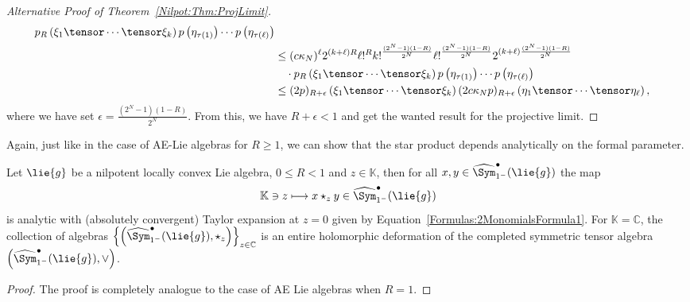 \begin{proof}[Alternative Proof of Theorem~\ref{Nilpot:Thm:ProjLimit}]
\begin{align*}
		p_R \left( \xi_1 \tensor \cdots \tensor \xi_k \right)
		p\left( \eta_{\tau(1)} \right)
		\cdots
		p\left( \eta_{\tau(\ell)} \right)
		\\
		& \leq
		(c \kappa_N)^{\ell}
		2^{(k + \ell) R}
		\ell!^R
		k!^{\frac{(2^N - 1) (1-R)}{2^N} }
		\ell!^{\frac{(2^N - 1) (1-R)}{2^N} }
		2^{ (k + \ell) \frac{(2^N - 1) (1-R)}{2^N} }
		\\
		& \quad
		\cdot
		p_R \left( \xi_1 \tensor \cdots \tensor \xi_k \right)
		p\left( \eta_{\tau(1)} \right)
		\cdots
		p\left( \eta_{\tau(\ell)} \right)
		\\
		& \leq
		(2 p)_{R + \epsilon} 
		\left( \xi_1 \tensor \cdots \tensor \xi_k  \right)
		(2 c \kappa_N p)_{R + \epsilon} 
		\left( \eta_1 \tensor \cdots \tensor \eta_\ell \right),
	\end{align*}
	where we have set $\epsilon = \frac{(2^N - 1)(1 - R)}{2^N}$. From this,
	we have $R + \epsilon < 1$ and get the wanted result for the 
	projective limit.
\end{proof}
Again, just like in the case of AE-Lie algebras for $R \geq 1$, we can show that 
the star product depends analytically on the formal parameter.
\begin{proposition}[Dependence on $z$]
    \label{Nilpot:corollary:HolomorphicDependence}%
    Let $\lie{g}$ be a nilpotent locally convex Lie algebra, $0 \leq R < 1$ and $z 
    \in \mathbb{K}$, then for all $x, y \in \widehat{\Sym}_{1^-}^\bullet(\lie{g})$ 
    the map
    \begin{equation}
        \label{Nilpot:Holomorphicity}
        \mathbb{K} \ni z
        \longmapsto
        x \star_z y \in
        \widehat{\Sym}_{1^-}^\bullet(\lie{g})
    \end{equation}
    is analytic with (absolutely convergent) Taylor expansion at $z = 0$ 
    given by Equation~\eqref{Formulas:2MonomialsFormula1}. For 
    $\mathbb{K} = \mathbb{C}$, the collection of algebras $\left\{ \left( 
    \widehat{\Sym}_{1^-}^\bullet(\lie{g}), \star_z \right) \right\}_{z \in 
    \mathbb{C}}$ is an entire holomorphic deformation of the completed 
    symmetric tensor algebra $\left( \widehat{\Sym}_{1^-}^\bullet(\lie{g}), \vee 
    \right)$.
\end{proposition}
\begin{proof}
	The proof is completely analogue to the case of AE Lie algebras when $R = 1$.
\end{proof}


%
%

